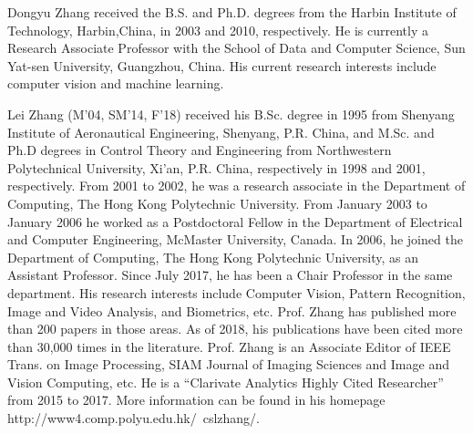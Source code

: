 \documentclass[journal]{IEEEtran}
\begin{document}
{\begin{IEEEbiography}{Dongyu Zhang} received the B.S. and Ph.D. degrees from the Harbin Institute of Technology, Harbin,China, in 2003 and 2010, respectively.
He is currently a Research Associate Professor with the School of Data and Computer Science, Sun Yat-sen University, Guangzhou, China. His current research interests include computer vision and machine learning.
\end{IEEEbiography}

\begin{IEEEbiography}{Lei Zhang} (M’04, SM’14, F’18) received his B.Sc. degree in 1995 from Shenyang Institute of Aeronautical Engineering, Shenyang, P.R. China, and M.Sc. and Ph.D degrees in Control Theory and Engineering from Northwestern Polytechnical University, Xi’an, P.R. China, respectively in 1998 and 2001, respectively. From 2001 to 2002, he was a research associate in the Department of Computing, The Hong Kong Polytechnic University. From January 2003 to January 2006 he worked as a Postdoctoral Fellow in the Department of Electrical and Computer Engineering, McMaster University, Canada. In 2006, he joined the Department of Computing, The Hong Kong Polytechnic University, as an Assistant Professor. Since July 2017, he has been a Chair Professor in the same department. His research interests include Computer Vision, Pattern Recognition, Image and Video Analysis, and Biometrics, etc. Prof. Zhang has published more than 200 papers in those areas. As of 2018, his publications have been cited more than 30,000 times in the literature. Prof. Zhang is an Associate Editor of IEEE Trans. on Image Processing, SIAM Journal of Imaging Sciences and Image and Vision Computing, etc. He is a ``Clarivate Analytics Highly Cited Researcher'' from 2015 to 2017. More information can be found in his homepage http://www4.comp.polyu.edu.hk/~cslzhang/.
\end{IEEEbiography}

% 

}
\end{document}

